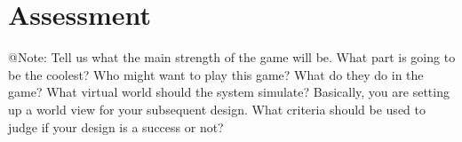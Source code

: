 
\section{Assessment}

\begin{TempText}
	@Note: Tell us what the main strength of the game will be. What part is going to be the coolest? Who might want to play this game? What do they do in the game? What virtual world should the system simulate? Basically, you are setting up a world view for your subsequent design. What criteria should be used to judge if your design is a success or not?
\end{TempText}

